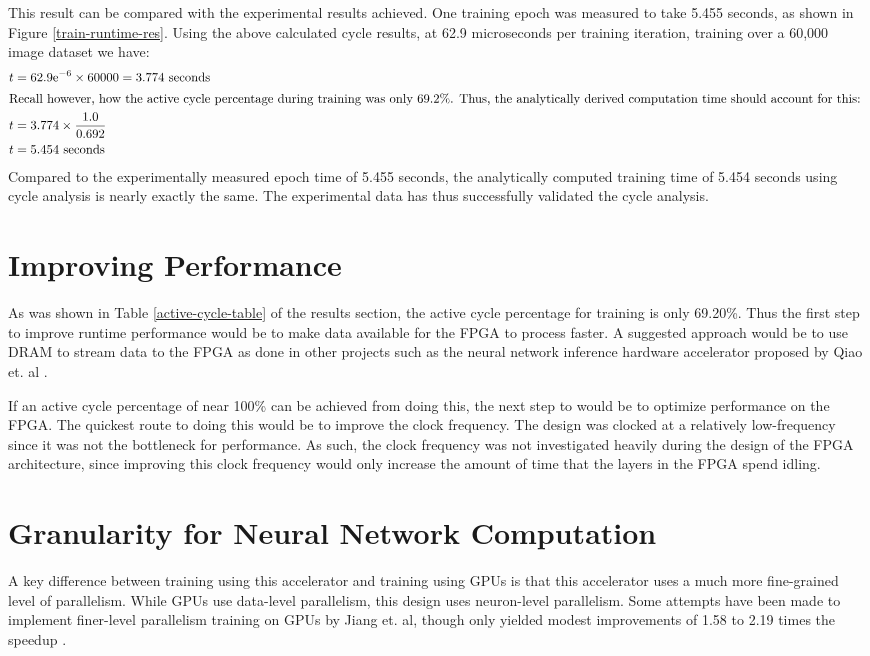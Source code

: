 This result can be compared with the experimental results achieved. One training epoch was measured to take 5.455 seconds, as shown in Figure \ref{train-runtime-res}. Using the above calculated cycle results, at 62.9 microseconds per training iteration, training over a 60,000 image dataset we have:
\begin{align}
	t &= 62.9\text{e}^{-6} \times 60000 = 3.774 \text{ seconds}\\
	\intertext{Recall however, how the active cycle percentage during training was only 69.2\%. Thus, the analytically derived computation time should account for this: }
	t &= 3.774 \times \frac{1.0}{0.692}\\
	t &= 5.454 \text{ seconds}
\end{align}
Compared to the experimentally measured epoch time of 5.455 seconds, the analytically computed training time of 5.454 seconds using cycle analysis is nearly exactly the same. The experimental data has thus successfully validated the cycle analysis.

\section{Improving Performance}
As was shown in Table \ref{active-cycle-table} of the results section, the active cycle percentage for training is only 69.20\%. Thus the first step to improve runtime performance would be to make data available for the FPGA to process faster. A suggested approach would be to use DRAM to stream data to the FPGA as done in other projects such as the neural network inference hardware accelerator proposed by Qiao et. al \cite{qiao}.

If an active cycle percentage of near 100\% can be achieved from doing this, the next step to would be to optimize performance on the FPGA. The quickest route to doing this would be to improve the clock frequency. The design was clocked at a relatively low-frequency since it was not the bottleneck for performance. As such, the clock frequency was not investigated heavily during the design of the FPGA architecture, since improving this clock frequency would only increase the amount of time that the layers in the FPGA spend idling.

\section{Granularity for Neural Network Computation}
A key difference between training using this accelerator and training using GPUs is that this accelerator uses a much more fine-grained level of parallelism. While GPUs use data-level parallelism, this design uses neuron-level parallelism. Some attempts  have been made to implement finer-level parallelism training on GPUs by Jiang et. al, though only yielded modest improvements of 1.58 to 2.19 times the speedup \cite{fine-grained-gpu}. 


